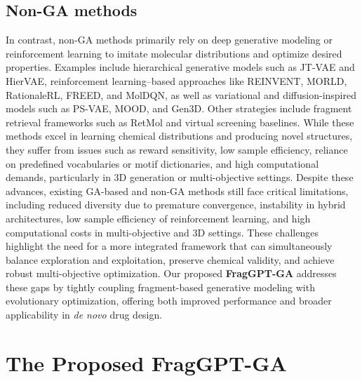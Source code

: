 \documentclass[lettersize,journal]{IEEEtran}
\begin{document}
\subsection{Non-GA methods}
In contrast, non-GA methods primarily rely on deep generative modeling or reinforcement learning to imitate molecular distributions and optimize desired properties. Examples include hierarchical generative models such as JT-VAE\cite{jinJunctionTreeVariational2018} and HierVAE\cite{jin2020hierarchical}, reinforcement learning–based approaches like REINVENT\cite{olivecronaMolecularDeNovoDesign2017}, MORLD\cite{jeon2020autonomous}, RationaleRL\cite{jinMultiObjectiveMoleculeGeneration2020}, FREED\cite{yang2021hit}, and MolDQN\cite{zhou2019optimization}, as well as variational and diffusion-inspired models such as PS-VAE\cite{kong2022molecule}, MOOD\cite{lee2023exploring}, and Gen3D\cite{luoGraph2022}. Other strategies include fragment retrieval frameworks such as RetMol\cite{wang2022retrieval} and virtual screening baselines\cite{graff2021accelerating}. While these methods excel in learning chemical distributions and producing novel structures, they suffer from issues such as reward sensitivity, low sample efficiency, reliance on predefined vocabularies or motif dictionaries, and high computational demands, particularly in 3D generation or multi-objective settings.
\noindent Despite these advances, existing GA-based and non-GA methods still face critical limitations, including reduced diversity due to premature convergence, instability in hybrid architectures, low sample efficiency of reinforcement learning, and high computational costs in multi-objective and 3D settings. These challenges highlight the need for a more integrated framework that can simultaneously balance exploration and exploitation, preserve chemical validity, and achieve robust multi-objective optimization. Our proposed \textbf{FragGPT-GA} addresses these gaps by tightly coupling fragment-based generative modeling with evolutionary optimization, offering both improved performance and broader applicability in \textit{de novo} drug design.

\section{The Proposed FragGPT-GA}
\end{document}
